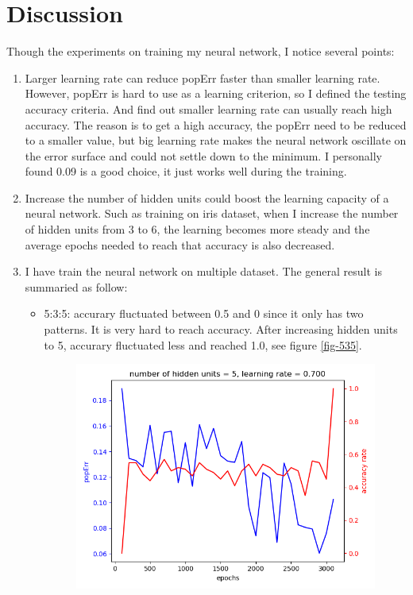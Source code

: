 \documentclass[11pt]{article}
\begin{document}
\section{Discussion}
\label{sec-4}
Though the experiments on training my neural network, I notice several points:
\begin{enumerate}
\item Larger learning rate can reduce popErr faster than smaller learning rate. However, popErr is hard to use as a learning criterion, so I defined the testing accuracy criteria. And find out smaller learning rate can usually reach high accuracy. The reason is to get a high accuracy, the popErr need to be reduced to a smaller value, but big learning rate makes the neural network oscillate on the error surface and could not settle down to the minimum. I personally found 0.09 is a good choice, it just works well during the training.
\item Increase the number of hidden units could boost the learning capacity of a neural network. Such as training on iris dataset, when I increase the number of hidden units from 3 to 6, the learning becomes more steady and the average epochs needed to reach that accuracy is also decreased.
\item I have train the neural network on multiple dataset. The general result is summaried as follow:
\begin{itemize}
\item 5:3:5: accurary fluctuated between 0.5 and 0 since it only has two patterns. It is very hard to reach accuracy. After increasing hidden units to 5, accurary fluctuated less and reached 1.0, see figure \ref{fig-535}.
\begin{figure}[htb]
\centering
\includegraphics[width=.9\linewidth]{./popErr_vs_accuracy_on_535.png}

\end{figure}
\end{itemize}
\end{enumerate}
\end{document}
